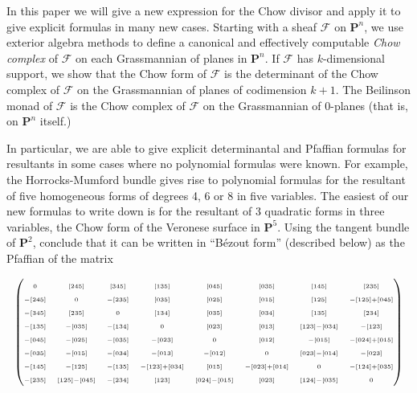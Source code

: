 \documentclass{jams-l}
\theoremstyle{definition}
\theoremstyle{remark}
\newcommand{\F}{{\mathcal F}}
\begin{document}
In this paper we will give a new expression for the Chow divisor and apply it
to give explicit formulas in many new cases. Starting with a sheaf $\F$ on
${\mathbf P}^n$, 
we use exterior algebra methods to define a canonical and effectively
computable {\it Chow complex\/} of $\F$ on each Grassmannian of planes in
${\mathbf P}^n$. 
If $\F$ has $k$-dimensional support, we show that the Chow form of $\F$
is the determinant of the Chow complex of $\F$ on the Grassmannian of planes
of codimension $k+1$. The Beilinson monad of $\F$ \cite{Beilinson 1978} is 
the Chow
complex of $\F$ on the Grassmannian of 0-planes (that is, on ${\mathbf P}^n$ 
itself.)

In particular, we are able to give explicit determinantal and Pfaffian formulas
for resultants in some cases where no polynomial formulas were known. For
example, the Horrocks-Mumford bundle gives rise to polynomial formulas for the
resultant of five homogeneous forms of degrees 4, 6 or 8 in five variables.
The easiest of our new formulas to write down is for the resultant of 3
quadratic forms in three variables, the Chow form of the Veronese surface in
${\mathbf P}^5$. Using 
the tangent bundle of ${\mathbf P}^2$,
conclude that it can be written
in ``B\'ezout form'' (described below) as the Pfaffian of the matrix

\[
\begin{pmatrix} \scriptscriptstyle  0    
&\scriptscriptstyle   [245] &\scriptscriptstyle [345] 
&\scriptscriptstyle   [135] &\scriptscriptstyle   [045] 
&\scriptscriptstyle    [035]&\scriptscriptstyle    [145] 
&\scriptscriptstyle     [235]   \cr\scriptscriptstyle -[245] 
&  \scriptscriptstyle   0   &\scriptscriptstyle -[235] 
&\scriptscriptstyle   [035] &  \scriptscriptstyle  [025] 
&  \scriptscriptstyle  [015] &  \scriptscriptstyle  [125] 
& \scriptscriptstyle -[125]+[045] \cr
\scriptscriptstyle -[345] &  \scriptscriptstyle [235] 
&  \scriptscriptstyle  0   & \scriptscriptstyle [134] 
&\scriptscriptstyle    [035] &   \scriptscriptstyle [034] 
& \scriptscriptstyle   [135] &     \scriptscriptstyle[234] \cr
\scriptscriptstyle -[135] & \scriptscriptstyle -[035] 
& \scriptscriptstyle -[134] &  \scriptscriptstyle  0   
&  \scriptscriptstyle [023] &   \scriptscriptstyle  [013] 
& \scriptscriptstyle [123]-[034]&\scriptscriptstyle   -[123]   \cr
\scriptscriptstyle -[045] & \scriptscriptstyle -[025] 
& \scriptscriptstyle -[035] & \scriptscriptstyle -[023] 
& \scriptscriptstyle    0   & \scriptscriptstyle [012] 
&  \scriptscriptstyle -[015] & \scriptscriptstyle -[024]+[015] \cr
\scriptscriptstyle -[035] & \scriptscriptstyle -[015] 
& \scriptscriptstyle -[034] &\scriptscriptstyle  -[013] 
& \scriptscriptstyle  -[012] & \scriptscriptstyle    0  
& \scriptscriptstyle [023]-[014] &\scriptscriptstyle  -[023]  \cr
\scriptscriptstyle -[145] & \scriptscriptstyle -[125] & 
\scriptscriptstyle -[135] &\scriptscriptstyle-[123]+[034] 
& \scriptscriptstyle  [015] &\scriptscriptstyle-[023]+[014] 
& \scriptscriptstyle 0 &\scriptscriptstyle -[124]+[035] \cr
\scriptscriptstyle -[235] &\scriptscriptstyle [125]-[045] 
&\scriptscriptstyle -[234] &   \scriptscriptstyle [123] & 
\scriptscriptstyle [024]-[015] & \scriptscriptstyle [023] 
& \scriptscriptstyle [124]-[035] &\scriptscriptstyle 0   
\end{pmatrix}
\]
\end{document}
